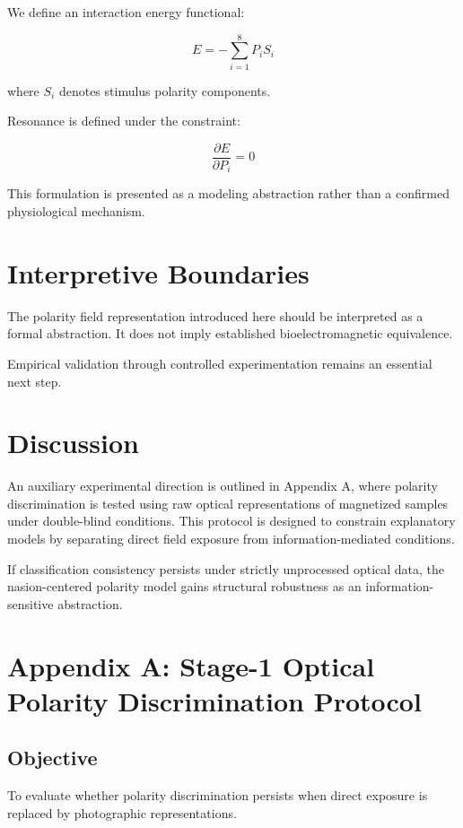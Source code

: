 \documentclass[11pt,a4paper]{article}
\begin{document}
We define an interaction energy functional:

\[
E = - \sum_{i=1}^{8} P_i S_i
\]

where $S_i$ denotes stimulus polarity components.

Resonance is defined under the constraint:

\[
\frac{\partial E}{\partial P_i} = 0
\]

This formulation is presented as a modeling abstraction rather than a confirmed physiological mechanism.

\section{Interpretive Boundaries}

The polarity field representation introduced here should be interpreted as a formal abstraction. It does not imply established bioelectromagnetic equivalence.

Empirical validation through controlled experimentation remains an essential next step.

\section{Discussion}

An auxiliary experimental direction is outlined in Appendix A, where polarity discrimination is tested using raw optical representations of magnetized samples under double-blind conditions. This protocol is designed to constrain explanatory models by separating direct field exposure from information-mediated conditions.

If classification consistency persists under strictly unprocessed optical data, the nasion-centered polarity model gains structural robustness as an information-sensitive abstraction.

\appendix

\section*{Appendix A: Stage-1 Optical Polarity Discrimination Protocol}

\subsection*{Objective}

To evaluate whether polarity discrimination persists when direct exposure is replaced by photographic representations.
\end{document}
